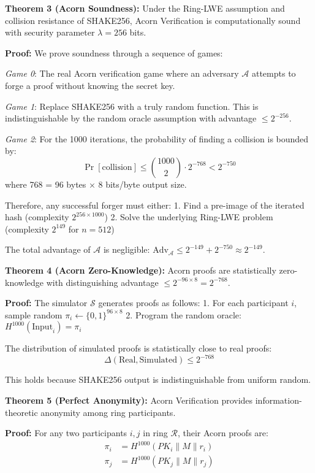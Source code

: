 \documentclass[11pt,a4paper]{article}
\begin{document}
\textbf{Theorem 3 (Acorn Soundness):} Under the Ring-LWE assumption and collision resistance of SHAKE256, Acorn Verification is computationally sound with security parameter $\lambda = 256$ bits.

\textbf{Proof:} We prove soundness through a sequence of games:

\textit{Game 0}: The real Acorn verification game where an adversary $\mathcal{A}$ attempts to forge a proof without knowing the secret key.

\textit{Game 1}: Replace SHAKE256 with a truly random function. This is indistinguishable by the random oracle assumption with advantage $\leq 2^{-256}$.

\textit{Game 2}: For the 1000 iterations, the probability of finding a collision is bounded by:
\begin{equation}
\Pr[\text{collision}] \leq \binom{1000}{2} \cdot 2^{-768} < 2^{-750}
\end{equation}
where 768 = 96 bytes × 8 bits/byte output size.

Therefore, any successful forger must either:
1. Find a pre-image of the iterated hash (complexity $2^{256 \times 1000}$)
2. Solve the underlying Ring-LWE problem (complexity $2^{149}$ for $n=512$)

The total advantage of $\mathcal{A}$ is negligible: $\text{Adv}_{\mathcal{A}} \leq 2^{-149} + 2^{-750} \approx 2^{-149}$.

\textbf{Theorem 4 (Acorn Zero-Knowledge):} Acorn proofs are statistically zero-knowledge with distinguishing advantage $\leq 2^{-96 \times 8} = 2^{-768}$.

\textbf{Proof:} The simulator $\mathcal{S}$ generates proofs as follows:
1. For each participant $i$, sample random $\pi_i \leftarrow \{0,1\}^{96 \times 8}$
2. Program the random oracle: $H^{1000}(\text{Input}_i) = \pi_i$

The distribution of simulated proofs is statistically close to real proofs:
\begin{equation}
\Delta(\text{Real}, \text{Simulated}) \leq 2^{-768}
\end{equation}

This holds because SHAKE256 output is indistinguishable from uniform random.

\textbf{Theorem 5 (Perfect Anonymity):} Acorn Verification provides information-theoretic anonymity among ring participants.

\textbf{Proof:} For any two participants $i, j$ in ring $\mathcal{R}$, their Acorn proofs are:
\begin{align}
\pi_i &= H^{1000}(PK_i \| M \| r_i) \\
\pi_j &= H^{1000}(PK_j \| M \| r_j)
\end{align}
\end{document}
